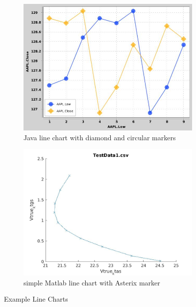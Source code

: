 \documentclass[12pt, a4paper,oneside]{report}
\begin{document}
\begin{figure}[!htbp]
	\begin{subfigure}{.5\textwidth}
		\centering
		\includegraphics[width=.8\linewidth]{line1}
		\caption{Java line chart with diamond and circular markers }
		\label{fig:sfig1}
	\end{subfigure}%
	\begin{subfigure}{.5\textwidth}
		\centering
		\includegraphics[width=.8\linewidth]{line2}
		\caption{simple Matlab line chart with Asterix marker}
		\label{fig:sfig2}
	\end{subfigure}
	\caption{Example Line Charts}
	\label{fig:fig}
\end{figure}
\end{document}
